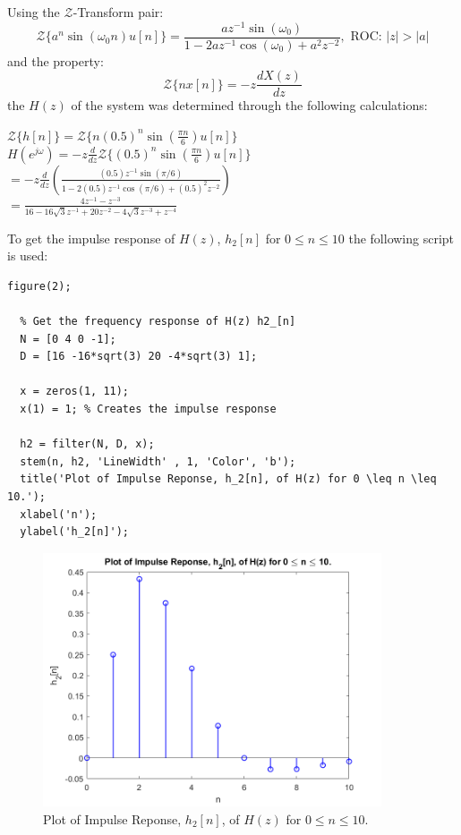 \documentclass[a4paper, 10pt]{article}
\begin{document}
\noindent Using the $\mathcal{Z}$-Transform pair:
\begin{equation}
  \mathcal{Z}\{a^n\sin(\omega_0n)u[n]\} = \frac {az^{-1}\sin(\omega_0)} {1-2az^{-1}\cos(\omega_0)+a^2z^{-2}},
  \text{ ROC: } |z|>|a|
\end{equation} 
and the property:
\begin{equation}
  \mathcal{Z}\{nx[n]\} = -z\frac {dX(z)} {dz}
\end{equation}
the $H(z)$ of the system was determined through the following calculations:
\begin{center}
  $\mathcal{Z}\{h[n]\} = \mathcal{Z}\{n(0.5)^n\sin(\frac{\pi n}{6})u[n]\}$\\
  $H(e^{j\omega})= -z\frac{d}{dz}\mathcal{Z}\{(0.5)^n\sin(\frac{\pi n}{6})u[n]\}$\\
  $= -z\frac{d}{dz}(\frac {(0.5)z^{-1}\sin(\pi/6)} {1-2(0.5)z^{-1}\cos(\pi/6)+(0.5)^2z^{-2}})$\\
  $= \frac {4z^{-1}-z^{-3}} {16 - 16\sqrt{3}z^{-1}+20z^{-2}-4\sqrt{3}z^{-3}+z^{-4}}$
\end{center}

\hfill 

\noindent To get the impulse response of $H(z)$, $h_2[n]$ for $0\leq n\leq 10$ the following script is used: 
\begin{lstlisting}[style=Matlab-editor, basicstyle=\small\ttfamily]
  figure(2);

  % Get the frequency response of H(z) h2_[n]
  N = [0 4 0 -1];
  D = [16 -16*sqrt(3) 20 -4*sqrt(3) 1];
  
  x = zeros(1, 11);
  x(1) = 1; % Creates the impulse response
  
  h2 = filter(N, D, x);
  stem(n, h2, 'LineWidth' , 1, 'Color', 'b');
  title('Plot of Impulse Reponse, h_2[n], of H(z) for 0 \leq n \leq 10.');
  xlabel('n');
  ylabel('h_2[n]');
\end{lstlisting}
\begin{figure}[H]
  \centering
  \includegraphics[width=10cm]{images/q1_c.png}
  \caption{Plot of Impulse Reponse, $h_2[n]$, of $H(z)$ for $0\leq n\leq 10$.}
\end{figure}
\end{document}
